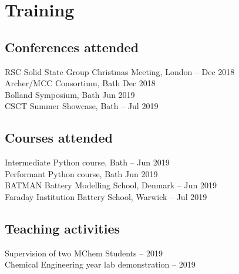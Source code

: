\section*{Training}
\thispagestyle{plain}
\subsection*{Conferences attended}
RSC Solid State Group Christmas Meeting, London \dotfill {}-- Dec 2018\\
Archer/MCC Consortium, Bath \dotfill {} Dec 2018\\
Bolland Symposium, Bath \dotfill {} Jun 2019\\
CSCT Summer Showcase, Bath \dotfill {}-- Jul 2019

\subsection*{Courses attended}
Intermediate Python course, Bath \dotfill {}-- Jun 2019\\
Performant Python course, Bath \dotfill {} Jun 2019\\
BATMAN Battery Modelling School, Denmark \dotfill {}-- Jun 2019\\
Faraday Institution Battery School, Warwick \dotfill {}-- Jul 2019

\subsection*{Teaching activities}
Supervision of two MChem Students  -- 2019\\
Chemical Engineering  year lab demonstration  -- 2019\\